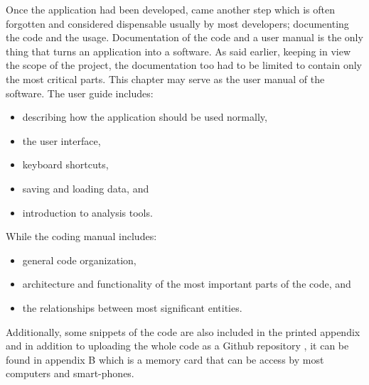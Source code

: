 {    Once the application had been developed, came another step which is often forgotten and considered dispensable usually by most developers; documenting the code and the usage. Documentation of the code and a user manual is the only thing that turns an application into a software. As said earlier, keeping in view the scope of the project, the documentation too had to be limited to contain only the most critical parts. This chapter may serve as the user manual of the software. The user guide includes:
    \begin{itemize}
      \item describing how the application should be used normally,
      \item the user interface,
      \item keyboard shortcuts,
      \item saving and loading data, and
      \item introduction to analysis tools.
    \end{itemize}
    While the coding manual includes:
    \begin{itemize}
      \item general code organization,
      \item architecture and functionality of the most important parts of the code, and
      \item the relationships between most significant entities.
    \end{itemize}
    Additionally, some snippets of the code are also included in the printed appendix and in addition to uploading the whole code as a Github repository \cite{bib20}, it can be found in appendix B which is a memory card that can be access by most computers and smart-phones.
}

